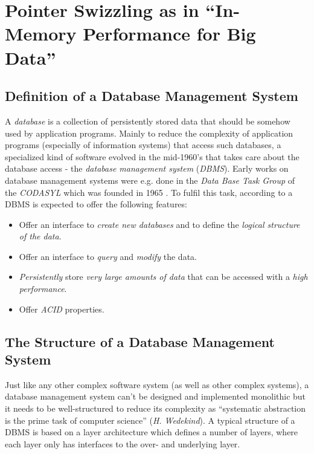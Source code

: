 \chapter[Pointer Swizzling in the DBMS Buffer Management]{Pointer Swizzling as in ``In-Memory Performance for Big Data'' \cite{Graefe:2014}} \label{ch:paper}

\section[Definition of a Database Management System]{Definition of a Database Management System}

    A \emph{database} is a collection of persistently stored data that should be somehow used by application programs. Mainly to reduce the complexity of application programs (especially of information systems) that access such databases, a specialized kind of software evolved in the mid-1960's that takes care about the database access - the \emph{database management system} (\emph{DBMS}). Early works on database management systems were e.g. done in the \emph{Data Base Task Group} of the \emph{CODASYL} which was founded in 1965 \cite{wikipedia.En_Data_Base_Task_Group}. To fulfil this task, according to \cite{GarciaMolina:2009} a DBMS is expected to offer the following features:
    \begin{itemize}
        \item Offer an interface to \emph{create new databases} and to define the \emph{logical structure of the data}.
        \item Offer an interface to \emph{query} and \emph{modify} the data.
        \item \emph{Persistently} store \emph{very large amounts of data} that can be accessed with a \emph{high performance}.
        \item Offer \emph{ACID} \cite{HaerderReuter83} properties.
    \end{itemize}

\section[Structure of a DBMS]{The Structure of a Database Management System}

    Just like any other complex software system (as well as other complex systems), a database management system can't be designed and implemented monolithic but it needs to be well-structured to reduce its complexity as ``systematic abstraction is the prime task of computer science'' (\emph{H. Wedekind}). A typical structure of a DBMS is based on a layer architecture which defines a number of layers, where each layer only has interfaces to the over- and underlying layer.

